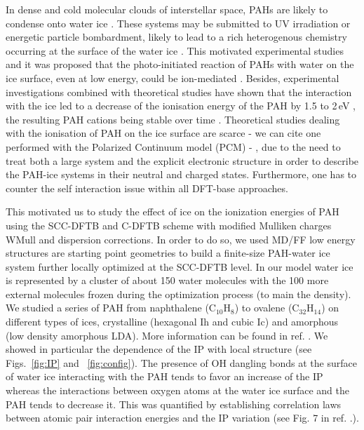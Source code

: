 \documentclass[]{interact}
\theoremstyle{plain}%
\theoremstyle{definition}
\theoremstyle{remark}
\begin{document}
In dense and cold  molecular clouds of interstellar space, PAHs are likely to condense onto water ice \cite{Bowman2011}. These systems may be submitted to UV irradiation or energetic particle bombardment, likely to lead to a rich heterogenous chemistry occurring at the surface of the water ice \cite{chemRev2016}. This motivated experimental studies \cite{barros17,Bernstein2001,Bernstein2007,Bernstein1999,Bouwman2009,Bowman2010,Guennoun2011,Guennoun2011bis} and it was proposed that the photo-initiated reaction of PAHs with water on the ice surface, even at low energy, could be ion-mediated \cite{Bouwman2009}. Besides, experimental investigations combined with theoretical studies have shown that  the interaction with the ice led to a decrease of the ionisation energy of the PAH by  1.5 to  2\,eV \cite{Gudipati2004,Woon_2004}, the resulting PAH cations being stable over time  \cite{Gudipati2006}. Theoretical studies dealing with the ionisation of PAH on the ice surface are scarce - we can cite one performed with the Polarized Continuum model (PCM) \cite{Woon_2004}- , due to the need to treat both a large system and the explicit electronic structure in order to describe the PAH-ice systems in their neutral and charged states. Furthermore, one has to counter the self interaction issue within all DFT-base approaches.

This motivated us to study the effect of ice on the ionization energies of PAH using the SCC-DFTB and C-DFTB scheme with modified Mulliken charges WMull and dispersion corrections. 
In order to do so, we used MD/FF low energy structures  \cite{Michoulier18a} are starting point geometries to build a finite-size  PAH-water ice system further locally optimized at the SCC-DFTB level. In our model  water ice is represented by a cluster of about 150 water molecules with the 100 more external molecules frozen during the optimization process (to main the density). We studied a series of PAH from naphthalene (C$_{10}$H$_{8}$) to ovalene (C$_{32}$H$_{14}$) on different types of ices, crystalline (hexagonal Ih and cubic Ic) and amorphous (low density amorphous LDA). More information can be found in ref. \cite{Michoulier18b}. 
We showed in particular the dependence of the IP with local structure  (see Figs.~\ref{fig:IP} and ~\ref{fig:config}). The presence of OH dangling bonds at the surface of water ice interacting with the PAH tends to favor an increase of the IP whereas the interactions between oxygen atoms at the water ice surface and the PAH tends to decrease it. This was quantified  by establishing correlation laws between atomic pair interaction energies and the IP variation  (see Fig. 7 in ref. \cite{Michoulier18b}.).
\end{document}

